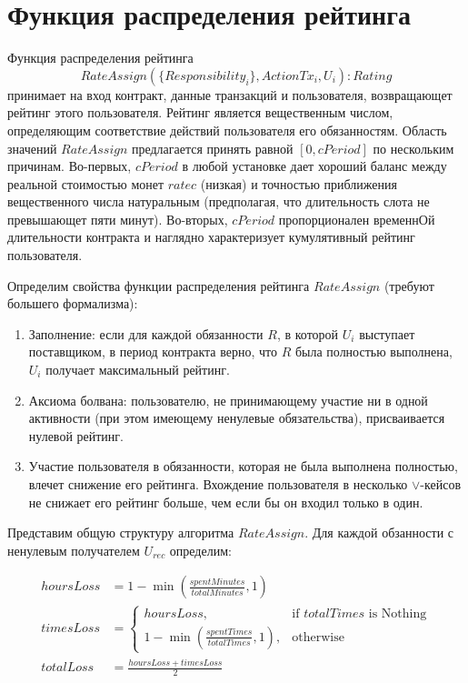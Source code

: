 \documentclass[]{itmo-student-thesis}
\begin{document}
\section{Функция распределения рейтинга}

Функция распределения рейтинга
\[RateAssign(\{Responsibility_i\},{ActionTx_i}, U_i) : Rating\]
принимает на вход контракт, данные транзакций и пользователя,
возвращающет рейтинг этого пользователя. Рейтинг является вещественным
числом, определяющим соответствие действий пользователя его
обязанностям. Область значений $RateAssign$ предлагается принять
равной $[0,cPeriod]$ по нескольким причинам. Во-первых, $cPeriod$ в
любой установке дает хороший баланс между реальной стоимостью монет
$ratec$ (низкая) и точностью приближения вещественного числа
натуральным (предполагая, что длительность слота не превышающет пяти
минут). Во-вторых, $cPeriod$ пропорционален временнОй длительности
контракта и наглядно характеризует кумулятивный рейтинг пользователя.

Определим свойства функции распределения рейтинга $RateAssign$
(требуют большего формализма):

\begin{enumerate}

\item Заполнение: если для каждой обязанности $R$, в которой $U_i$
  выступает поставщиком, в период контракта верно, что $R$ была
  полностью выполнена, $U_i$ получает максимальный рейтинг.

\item Аксиома болвана: пользователю, не принимающему участие ни в
  одной активности (при этом имеющему ненулевые обязательства),
  присваивается нулевой рейтинг.

\item Участие пользователя в обязанности, которая не была выполнена
  полностью, влечет снижение его рейтинга. Вхождение пользователя в
  несколько $\vee$-кейсов не снижает его рейтинг больше, чем если бы
  он входил только в один.
\end{enumerate}

Представим общую структуру алгоритма $RateAssign$. Для каждой
обзанности с ненулевым получателем $U_{rec}$ определим:

\begin{align*}
hoursLoss &= 1 - \min(\frac{spentMinutes}{totalMinutes}, 1)
\\
timesLoss &=
\begin{cases}
          hoursLoss, & \text{if } totalTimes \text{ is Nothing} \\
          1 - \min(\frac{spentTimes}{totalTimes}, 1), & \text{otherwise}
\end{cases}
\\
totalLoss &= \frac{hoursLoss + timesLoss}{2}
\end{align*}
\end{document}
